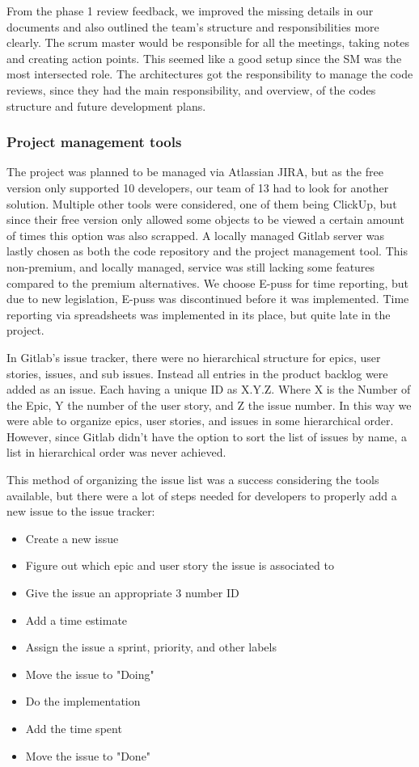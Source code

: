 \documentclass{article}
\begin{document}
From the phase 1 review feedback, we improved the missing details in our documents and also outlined the team's structure and responsibilities more clearly. The scrum master would be responsible for all the meetings, taking notes and creating action points. This seemed like a good setup since the SM was the most intersected role. The architectures got the responsibility to manage the code reviews, since they had the main responsibility, and overview, of the codes structure and future development plans.

\subsubsection{Project management tools}\label{project_tools}

The project was planned to be managed via Atlassian JIRA, but as the free version only supported 10 developers, our team of 13 had to look for another solution. Multiple other tools were considered, one of them being ClickUp, but since their free version only allowed some objects to be viewed a certain amount of times this option was also scrapped. A locally managed Gitlab server was lastly chosen as both the code repository and the project management tool. This non-premium, and locally managed, service was still lacking some features compared to the premium alternatives. We choose E-puss for time reporting, but due to new legislation, E-puss was discontinued before it was implemented. Time reporting via spreadsheets was implemented in its place, but quite late in the project.

In Gitlab's issue tracker, there were no hierarchical structure for epics, user stories, issues, and sub issues. Instead all entries in the product backlog were added as an issue. Each having a unique ID as X.Y.Z. Where X is the Number of the Epic, Y the number of the user story, and Z the issue number. In this way we were able to organize epics, user stories, and issues in some hierarchical order. However, since Gitlab didn't have the option to sort the list of issues by name, a list in hierarchical order was never achieved.

This method of organizing the issue list was a success considering the tools available, but there were a lot of steps needed for developers to properly add a new issue to the issue tracker:

\begin{itemize}
    \item Create a new issue
    \item Figure out which epic and user story the issue is associated to
    \item Give the issue an appropriate 3 number ID
    \item Add a time estimate
    \item Assign the issue a sprint, priority, and other labels
    \item Move the issue to "Doing"
    \item Do the implementation
    \item Add the time spent
    \item Move the issue to "Done"
\end{itemize}
\end{document}

